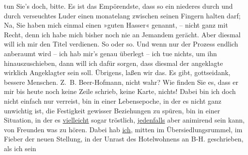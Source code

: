 \begin{ledgroupsized}[t]{13cm}
               tun Sie’s doch, bitte. Es ist das Empörendste, dass so ein niederes {\pb}durch und durch verseuchtes
               Luder einen monatelang zwischen seinen Fingern halten darf; Na, Sie haben mich einmal
               einen »guten Hasser« genannt, – nicht ganz mit Recht, denn ich habe mich bisher noch
               nie an Jemandem gerächt. Aber diesmal will ich mir den Titel verdienen. So oder so.
               Und wenn nur der Prozess endlich anberaumt wird – ich hab mir’s genau überlegt – ich
               tue nichts, um ihn hinauszuschieben, dann will ich dafür sorgen, dass diesmal der
               angeklagte wirklich Angeklagter sein soll. \pend
           \pstart
           Übrigens, laßen wir das. Es gibt, gottseidank, bessere Menschen. Z. B. Beer-Hofmann, nicht wahr? Wie finden Sie es,
               dass er mir bis heute noch keine Zeile schrieb, keine Karte, nichts! Dabei bin ich
               doch nicht einfach nur verreist, bin in einer Lebensepoche, in der es nicht ganz
               unwichtig ist, die Festigkeit gewisser Beziehungen zu spüren, bin in einer Situation,
               in der es \uline{vielleicht} sogar tröstlich, \uline{jedenfalls} aber animirend sein kann, von Freunden was
               zu hören. Dabei hab \uline{ich}, mitten im
               Übersiedlungsrummel, im Fieber der neuen Stellung, in der Unrast des Hotelwohnens an
                  B-H. geschrieben, als ich sein \label{K_L03415-88v}
\end{ledgroupsized}
